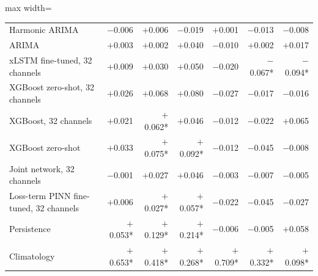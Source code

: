 \begin{table}[tbp]
\begin{adjustbox}{max width=\textwidth}
\begin{tabular}{lrrrrrr}
Harmonic ARIMA & $-$0.006 & $+$0.006 & $-$0.019 & $+$0.001 & $-$0.013 & $-$0.008 \\
ARIMA & $+$0.003 & $+$0.002 & $+$0.040 & $-$0.010 & $+$0.002 & $+$0.017 \\
xLSTM fine-tuned, 32 channels & $+$0.009 & $+$0.030 & $+$0.050 & $-$0.020 & $-$0.067* & $-$0.094* \\
XGBoost zero-shot, 32 channels & $+$0.026 & $+$0.068 & $+$0.080 & $-$0.027 & $-$0.017 & $-$0.016 \\
XGBoost, 32 channels & $+$0.021 & $+$0.062* & $+$0.046 & $-$0.012 & $-$0.022 & $+$0.065 \\
XGBoost zero-shot & $+$0.033 & $+$0.075* & $+$0.092* & $-$0.012 & $-$0.045 & $-$0.008 \\
Joint network, 32 channels & $-$0.001 & $+$0.027 & $+$0.046 & $-$0.003 & $-$0.007 & $-$0.005 \\
Loss-term PINN fine-tuned, 32 channels & $+$0.006 & $+$0.027* & $+$0.057* & $-$0.022 & $-$0.045 & $-$0.027 \\
Persistence & $+$0.053* & $+$0.129* & $+$0.214* & $-$0.006 & $-$0.005 & $+$0.058 \\
Climatology & $+$0.653* & $+$0.418* & $+$0.268* & $+$0.709* & $+$0.332* & $+$0.098* \\
\bottomrule
\end{tabular}
\end{adjustbox}
\end{table}
